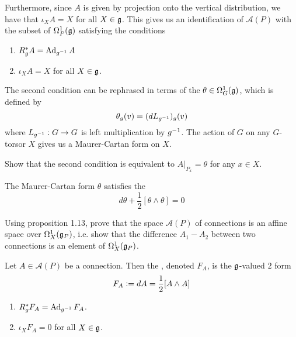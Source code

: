 %
Furthermore, since $A$ is given by projection onto the vertical distribution,
we have that $\iota_XA = X$ for all $X \in \mathfrak{g}$. This gives us an identification
of $\mathscr{A}(P)$ with the subset of $\Omega^1_P(\mathfrak{g})$ satisfying the conditions
\begin{enumerate}
  \item $R_g^*A = \operatorname{Ad}_{g^{-1}}A$
  \item $\iota_XA = X$ for all $X \in \mathfrak{g}$.
\end{enumerate}
%
The second condition can be rephrased in terms of the 
$\theta \in \Omega^1_G(\mathfrak{g})$, which is defined by
\[
\theta_g(v) = (dL_{g^{-1}})_g(v)
\]
where $L_{g^{-1}} : G \to G$ is left multiplication by $g^{-1}$. The action
of $G$ on any $G$-torsor $X$ gives us a Maurer-Cartan form on $X$.
%
\begin{exer}
Show that the second condition is equivalent to $A\vert_{P_x} = \theta$
for any $x \in X$.
\end{exer}
%
The Maurer-Cartan form $\theta$ satisfies the 
\[
d\theta + \frac{1}{2}[\theta\wedge\theta] = 0
\]
%
\begin{exer}
Using proposition 1.13, prove that the space $\mathscr{A}(P)$ of connections
is an affine space over $\Omega^1_X(\mathfrak{g}_P)$, i.e. show that the difference
$A_1 - A_2$ between two connections is an element of $\Omega^1_X(\mathfrak{g}_P)$.
\end{exer}
%
\begin{defn}
Let $A \in \mathscr{A}(P)$ be a connection. Then the ,
denoted $F_A$, is the $\mathfrak{g}$-valued $2$ form
\[
F_A \vcentcolon= dA = \frac{1}{2}[A \wedge A]
\]
\end{defn}
%
\begin{prop} \enumbreak
\begin{enumerate}
  \item $R^*_gF_A = \operatorname{Ad}_{g^{-1}}F_A$.
  \item $\iota_XF_A = 0$ for all $X \in \mathfrak{g}$.
\end{enumerate}
\end{prop}
%
